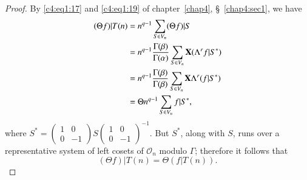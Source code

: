 \begin{proof}
By \eqref{c4:eq1:17} and \eqref{c4:eq1:19} of chapter~\ref{chap4}, 
\S~\ref{chap4:sec1}, we have 
\begin{align*}
(\Theta f) |T(n) & = n^{q-1} \sum_{S\in V_n} (\Theta f)|S\\
& = n^{q-1} \frac{\Gamma(\beta)}{\Gamma(\alpha)} \sum_{S\in
    V_n} \mathbf{X} (\Lambda^r f|S^{\ast})\\
& = n^{q-1} \frac{\Gamma(\beta)}{\Gamma(\beta)} \sum_{S\in
    V_n} \mathbf{X} \Lambda^r (f|S^{\ast})\\
& = \Theta n^{q-1} \sum_{S\in V_n} f|S^{\ast}, 
\end{align*}
where $S^{\ast} = \left(\begin{smallmatrix}
  1&0\\0&-1 \end{smallmatrix}\right) S
\left(\begin{smallmatrix}
1&0\\0&-1  \end{smallmatrix}\right)^{-1}$. But $S^{\ast}$, along
with $S$, runs over a representative system of left cosets of
$\mathcal{O}_n$ modulo $\Gamma$; therefore it follows that 
$$
(\Theta f)|T(n) = \Theta (f|T(n)).
$$


\end{proof}
